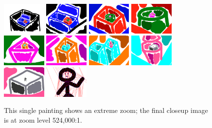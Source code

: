 \documentclass[conference]{acmsiggraph}
\begin{document}
\begin{figure}
    \centering
        \includegraphics[width=0.195\textwidth]{images/zoom61}
        \includegraphics[width=0.195\textwidth]{images/zoom62}
        \includegraphics[width=0.195\textwidth]{images/zoom63}
        \includegraphics[width=0.195\textwidth]{images/zoom64}
        \includegraphics[width=0.195\textwidth]{images/zoom65}
        \includegraphics[width=0.195\textwidth]{images/zoom66}
        \includegraphics[width=0.195\textwidth]{images/zoom67}
        \includegraphics[width=0.195\textwidth]{images/zoom68}
        \includegraphics[width=0.195\textwidth]{images/zoom69}
        \includegraphics[width=0.195\textwidth]{images/zoom72}
    \caption{This single painting shows an extreme zoom; the final closeup image is at zoom level 524,000:1.}
    \label{fig:boxes}
\end{figure}
\end{document}
